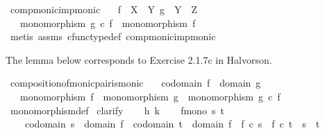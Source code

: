 \begin{isabellebody}
%
\endisatagproof
{\isafoldproof}%
%
\isadelimproof
\isanewline
%
\endisadelimproof
\isanewline
{}\isamarkupfalse%
\ comp{\isacharunderscore}{\kern0pt}monic{\isacharunderscore}{\kern0pt}imp{\isacharunderscore}{\kern0pt}monic{\isacharprime}{\kern0pt}{\isacharcolon}{\kern0pt}\isanewline
\ \ \ {\isachardoublequoteopen}f\ {\isacharcolon}{\kern0pt}\ X\ {\isasymrightarrow}\ Y{\isachardoublequoteclose}\ {\isachardoublequoteopen}g\ {\isacharcolon}{\kern0pt}\ Y\ {\isasymrightarrow}\ Z{\isachardoublequoteclose}\isanewline
\ \ \ {\isachardoublequoteopen}monomorphism\ {\isacharparenleft}{\kern0pt}g\ {\isasymcirc}\isactrlsub c\ f{\isacharparenright}{\kern0pt}\ {\isasymLongrightarrow}\ monomorphism\ f{\isachardoublequoteclose}\isanewline
%
\isadelimproof
\ \ %
\endisadelimproof
%
\isatagproof
{}\isamarkupfalse%
\ {\isacharparenleft}{\kern0pt}metis\ assms\ cfunc{\isacharunderscore}{\kern0pt}type{\isacharunderscore}{\kern0pt}def\ comp{\isacharunderscore}{\kern0pt}monic{\isacharunderscore}{\kern0pt}imp{\isacharunderscore}{\kern0pt}monic{\isacharparenright}{\kern0pt}%
\endisatagproof
{\isafoldproof}%
%
\isadelimproof
%
\endisadelimproof
%
\begin{isamarkuptext}%
The lemma below corresponds to Exercise 2.1.7c in Halvorson.%
\end{isamarkuptext}\isamarkuptrue%
\isamarkupfalse%
\ composition{\isacharunderscore}{\kern0pt}of{\isacharunderscore}{\kern0pt}monic{\isacharunderscore}{\kern0pt}pair{\isacharunderscore}{\kern0pt}is{\isacharunderscore}{\kern0pt}monic{\isacharcolon}{\kern0pt}\isanewline
\ \ \ {\isachardoublequoteopen}codomain\ f\ {\isacharequal}{\kern0pt}\ domain\ g{\isachardoublequoteclose}\isanewline
\ \ \ {\isachardoublequoteopen}monomorphism\ f\ {\isasymLongrightarrow}\ monomorphism\ g\ {\isasymLongrightarrow}\ monomorphism\ {\isacharparenleft}{\kern0pt}g\ {\isasymcirc}\isactrlsub c\ f{\isacharparenright}{\kern0pt}{\isachardoublequoteclose}\isanewline
%
\isadelimproof
\ \ %
\endisadelimproof
%
\isatagproof
{}\isamarkupfalse%
\ monomorphism{\isacharunderscore}{\kern0pt}def\isanewline
{}\isamarkupfalse%
\ clarify\isanewline
\ \ \isamarkupfalse%
\ h\ k\isanewline
\ \ \isamarkupfalse%
\ f{\isacharunderscore}{\kern0pt}mono{\isacharcolon}{\kern0pt}\ {\isachardoublequoteopen}{\isasymforall}s\ t{\isachardot}{\kern0pt}\ \isanewline
\ \ \ \ codomain\ s\ {\isacharequal}{\kern0pt}\ domain\ f\ {\isasymand}\ codomain\ t\ {\isacharequal}{\kern0pt}\ domain\ f\ {\isasymlongrightarrow}\ f\ {\isasymcirc}\isactrlsub c\ s\ {\isacharequal}{\kern0pt}\ f\ {\isasymcirc}\isactrlsub c\ t\ {\isasymlongrightarrow}\ s\ {\isacharequal}{\kern0pt}\ t{\isachardoublequoteclose}\isanewline

\end{isabellebody}
